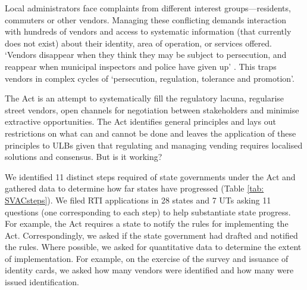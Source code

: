 \documentclass[a4paper, 12pt, twoside, table]{article}
\begin{document}
{	Local administrators face complaints from different interest groups—residents, commuters or other vendors. Managing these conflicting demands interaction with hundreds of vendors and access to systematic information (that currently does not exist) about their identity, area of operation, or services offered. `Vendors disappear when they think they may be subject to persecution, and reappear when municipal inspectors and police have given up' \parencite{bromleypaper}. This traps vendors in complex cycles of `persecution, regulation, tolerance and promotion'.

	The Act is an attempt to systematically fill the regulatory lacuna, regularise street vendors, open channels for negotiation between stakeholders and minimise extractive opportunities. The Act identifies general principles and lays out restrictions on what can and cannot be done and leaves the application of these principles to ULBs given that regulating and managing vending requires localised solutions and consensus. But is it working?

	We identified 11 distinct steps required of state governments under the Act and gathered data to determine how far states have progressed (Table \ref{tab: SVACsteps}). We filed RTI applications in 28 states and 7 UTs asking 11 questions (one corresponding to each step) to help substantiate state progress. For example, the Act requires a state to notify the rules for implementing the Act. Correspondingly, we asked if the state government had drafted and notified the rules. Where possible, we asked for quantitative data to determine the extent of implementation. For example, on the exercise of the survey and issuance of identity cards, we asked how many vendors were identified and how many were issued identification.

}
\end{document}
